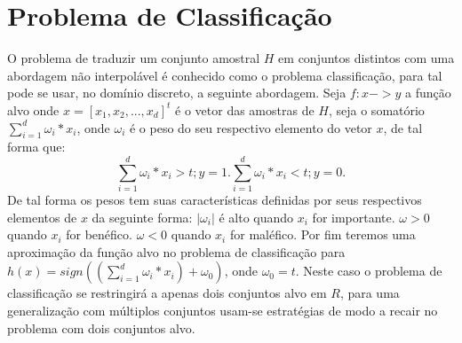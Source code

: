 \documentclass[pfc]{imetex}
\begin{document}
\section{Problema de Classificação}
    \newline
    O problema de traduzir um conjunto amostral $H$ em conjuntos distintos com uma abordagem não interpolável é conhecido como o problema classificação, para tal pode se usar, no domínio discreto, a seguinte abordagem. Seja $f: x->y$ a função alvo onde $x = [x_1,x_2,...,x_d]^t$ é o vetor das amostras de $H$, seja o somatório $\sum\limits_{i=1}^d \omega_i*x_i$, onde $\omega_i$ é o peso do seu respectivo elemento do vetor $x$, de tal forma que:
    \newline
    \begin{equation}
        \sum\limits_{i=1}^d \omega_i*x_i>t; y = 1.
        \sum\limits_{i=1}^d \omega_i*x_i<t; y = 0.
    \end{equation}
    \newline
    De tal forma os pesos tem suas características definidas por seus respectivos elementos de $x$ da seguinte forma:\newline
    $|\omega_i|$ é alto quando $x_i$ for importante.\newline
    $\omega > 0$ quando $x_i$ for benéfico.\newline
    $\omega < 0$ quando $x_i$ for maléfico.\newline
    Por fim teremos uma aproximação da função alvo no problema de classificação para $h(x) = sign((\sum\limits_{i=1}^d \omega_i*x_i)+\omega_0)$, onde $\omega_0 = t$.
    \newline
    Neste caso o problema de classificação se restringirá a apenas dois conjuntos alvo em $R$, para uma generalização com múltiplos conjuntos usam-se estratégias de modo a recair no problema com dois conjuntos alvo.
    \newline
\end{document}
